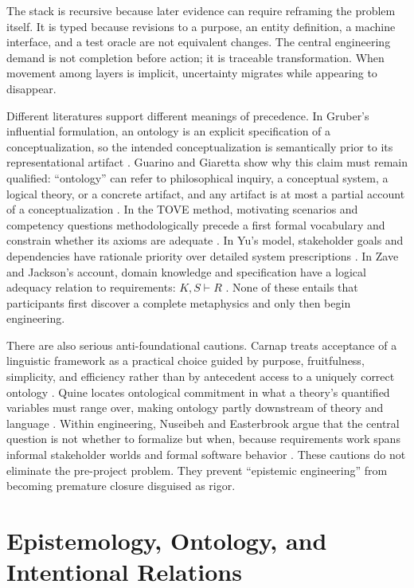 \documentclass[10pt,a4paper]{article}
\begin{document}
The stack is recursive because later evidence can require reframing the problem itself. It is typed because revisions to a purpose, an entity definition, a machine interface, and a test oracle are not equivalent changes. The central engineering demand is not completion before action; it is traceable transformation. When movement among layers is implicit, uncertainty migrates while appearing to disappear.

Different literatures support different meanings of precedence. In Gruber's influential formulation, an ontology is an explicit specification of a conceptualization, so the intended conceptualization is semantically prior to its representational artifact \cite{gruber1993}. Guarino and Giaretta show why this claim must remain qualified: ``ontology'' can refer to philosophical inquiry, a conceptual system, a logical theory, or a concrete artifact, and any artifact is at most a partial account of a conceptualization \cite{guarino1995}. In the TOVE method, motivating scenarios and competency questions methodologically precede a first formal vocabulary and constrain whether its axioms are adequate \cite{gruninger1995}. In Yu's model, stakeholder goals and dependencies have rationale priority over detailed system prescriptions \cite{yu1997}. In Zave and Jackson's account, domain knowledge and specification have a logical adequacy relation to requirements: $K,S \vdash R$ \cite{zavejackson1997}. None of these entails that participants first discover a complete metaphysics and only then begin engineering.

There are also serious anti-foundational cautions. Carnap treats acceptance of a linguistic framework as a practical choice guided by purpose, fruitfulness, simplicity, and efficiency rather than by antecedent access to a uniquely correct ontology \cite{carnap1950}. Quine locates ontological commitment in what a theory's quantified variables must range over, making ontology partly downstream of theory and language \cite{quine1948}. Within engineering, Nuseibeh and Easterbrook argue that the central question is not whether to formalize but when, because requirements work spans informal stakeholder worlds and formal software behavior \cite{nuseibeh2000}. These cautions do not eliminate the pre-project problem. They prevent ``epistemic engineering'' from becoming premature closure disguised as rigor.

\section{Epistemology, Ontology, and Intentional Relations}
\end{document}
